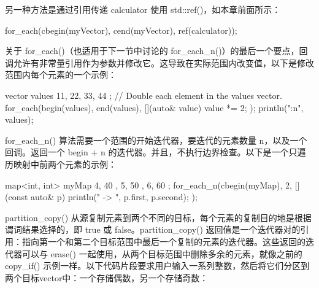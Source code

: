 另一种方法是通过引用传递 calculator 使用 std::ref()，如本章前面所示：

\begin{cpp}
for_each(cbegin(myVector), cend(myVector), ref(calculator));
\end{cpp}

关于 for\_each()（也适用于下一节中讨论的 for\_each\_n()）的最后一个要点，回调允许有非常量引用作为参数并修改它。这导致在实际范围内改变值，以下是修改范围内每个元素的一个示例：

\begin{cpp}
vector values { 11, 22, 33, 44 };
// Double each element in the values vector.
for_each(begin(values), end(values), [](auto& value) { value *= 2; });
println("{:n}", values);
\end{cpp}


for\_each\_n() 算法需要一个范围的开始迭代器，要迭代的元素数量 n，以及一个回调。返回一个 begin + n 的迭代器。并且，不执行边界检查。以下是一个只遍历映射中前两个元素的示例：

\begin{cpp}
map<int, int> myMap { { 4, 40 }, { 5, 50 }, { 6, 60 } };
for_each_n(cbegin(myMap), 2, [](const auto& p)
    { println("{} -> {}", p.first, p.second); });
\end{cpp}


partition\_copy() 从源复制元素到两个不同的目标，每个元素的复制目的地是根据谓词结果选择的，即 true 或 false。partition\_copy() 返回值是一个迭代器对的引用：指向第一个和第二个目标范围中最后一个复制的元素的迭代器。这些返回的迭代器可以与 erase() 一起使用，从两个目标范围中删除多余的元素，就像之前的 copy\_if() 示例一样。以下代码片段要求用户输入一系列整数，然后将它们分区到两个目标vector中：一个存储偶数，另一个存储奇数：



